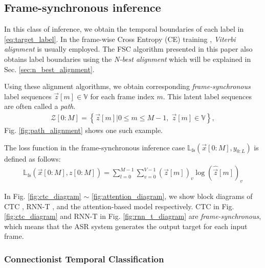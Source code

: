 \documentclass{article}
\begin{document}
\subsection{Frame-synchronous inference}
\label{sec:frame_synchronous_inference}
In this class of inference,  we obtain
the temporal boundaries of each label in \eqref{eq:target_label}.
In the frame-wise Cross Entropy (CE) training 
\cite{g_hinton_ieee_signal_processing_mag_2012_00, 
C_Kim_INTERSPEECH_2017_1, 
B_Li_INTERSPEECH_2017_1}, {\it Viterbi alignment}  
\cite{
x_huang_prentice_hall_2001_00,
l_r_rabiner_proceedings_of_ieee_1989_00} is usually employed. 
The FSC algorithm presented in this paper also obtains
label boundaries using the {\it N-best alignment} which will
be explained in Sec. \ref{sec:n_best_alignment}.

Using these alignment algorithms, 
we obtain corresponding {\it frame-synchronous} label sequences 
$\vec{z}[m] \in \mathbb{V}$ for each frame index $m$. This
latent label sequences are often called a {\it path}.
  \begin{align}
    \mathcal{Z}[0:M]  =  
      \left\{\vec{z}[m]  \Big| 0 \le m \le M-1, \; \vec{z}[m] \in \mathbb{V} \right\}, 
    \label{eq:latent_label_seq}
  \end{align}
Fig. \ref{fig:path_alignment} shows one such example. 

The loss function in the frame-synchronous inference case
$\mathbb{L}_{\text{fs}}\left(\vec{x}[0:M], y_{0:L}\right)$ is 
defined as follows:
\begin{align}
  \mathbb{L}_{\text{fs}}\left(\vec{x}[0:M], z[0:M]\right) 
      = \sum_{l=0}^{M-1} 
          \sum_{v=0}^{V-1}  
            (\vec{z}[m])_v  
            \log (\widehat{\vec{z}}[m])_v  
        \label{eq:frame_synchronous_ce_loss} 
\end{align}


 In Fig. 
\ref{fig:ctc_diagram} $\sim$ \ref{fig:attention_diagram}, we show
block diagrams of CTC \cite{a_graves_icml_2006_00}, 
RNN-T \cite{a_graves_corr_2012_00, a_graves_icassp_2013_00}, and 
the attention-based model 
\cite{
j_chorowski_nips_2015_00,
w_chan_icassp_2016_00} respectively. CTC in Fig. \ref{fig:ctc_diagram} 
and RNN-T in Fig. \ref{fig:rnn_t_diagram} are {\it frame-synchronous}, 
which means that the ASR system generates the output target for each 
input frame.


\subsubsection{Connectionist Temporal Classification}
\label{sec:ctc}
\end{document}

